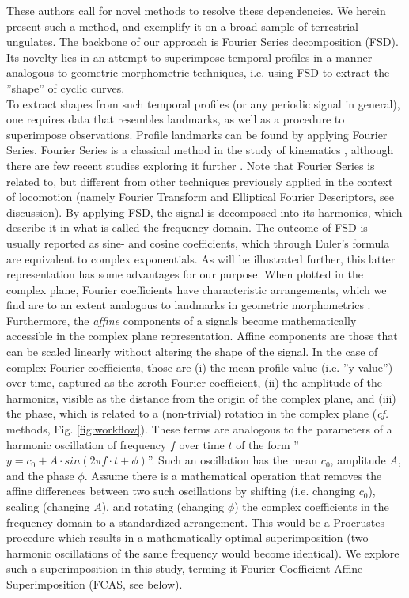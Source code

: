 These authors call for novel methods to resolve these dependencies.
We herein present such a method, and exemplify it on a broad sample of terrestrial ungulates.
The backbone of our approach is Fourier Series decomposition (FSD).
Its novelty lies in an attempt to superimpose temporal profiles in a manner analogous to geometric morphometric techniques, i.e. using FSD to extract the ''shape'' of cyclic curves.
\\To extract shapes from such temporal profiles (or any periodic signal in general), one requires data that resembles landmarks, as well as a procedure to superimpose observations.
Profile landmarks can be found by applying Fourier Series.
Fourier Series is a classical method in the study of kinematics \citep{Bernstein1927a,Bernstein1935}, although there are few recent studies exploring it further \citep{vanWeeren1992,Grasso2000,Webb2007}.
Note that Fourier Series is related to, but different from other techniques previously applied in the context of locomotion (namely Fourier Transform and Elliptical Fourier Descriptors, see discussion).
By applying FSD, the signal is decomposed into its harmonics, which describe it in what is called the frequency domain.
The outcome of FSD is usually reported as sine- and cosine coefficients, which through Euler's formula are equivalent to complex exponentials.
As will be illustrated further, this latter representation has some advantages for our purpose.
When plotted in the complex plane, Fourier coefficients have characteristic arrangements, which we find are to an extent analogous to landmarks in geometric morphometrics \citep{Bookstein1991,Kendall1989}.
Furthermore, the \textit{affine} components of a signals become mathematically accessible in the complex plane representation.
Affine components are those that can be scaled linearly without altering the shape of the signal.
In the case of complex Fourier coefficients, those are (i) the mean profile value (i.e. ''y-value'') over time, captured as the zeroth Fourier coefficient, (ii) the amplitude of the harmonics, visible as the distance from the origin of the complex plane, and (iii) the phase, which is related to a (non-trivial) rotation in the complex plane (\textit{cf.} methods, Fig. \ref{fig:workflow}).
These terms are analogous to the parameters of a harmonic oscillation of frequency $f$ over time $t$ of the form ''$y = c_0 + A\cdot sin(2\pi f\cdot t + \phi)$''.
Such an oscillation has the mean $c_0$, amplitude $A$, and the phase $\phi$.
Assume there is a mathematical operation that removes the affine differences between two such oscillations by shifting (i.e. changing $c_0$), scaling (changing $A$), and rotating (changing $\phi$) the complex coefficients in the frequency domain to a standardized arrangement.
This would be a Procrustes procedure which results in a mathematically optimal superimposition (two harmonic oscillations of the same frequency would become identical).
We explore such a superimposition in this study, terming it Fourier Coefficient Affine Superimposition (FCAS, see below).

